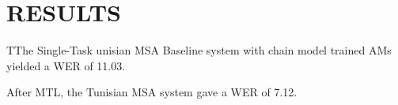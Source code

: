   \section{RESULTS}
\label{sec-5}

TThe Single-Task unisian \gls{MSA} Baseline system with chain model trained \gls{AM}s yielded a \gls{WER} of 11.03. %

After MTL, the Tunisian \gls{MSA} system gave a \gls{WER} of 7.12. %
